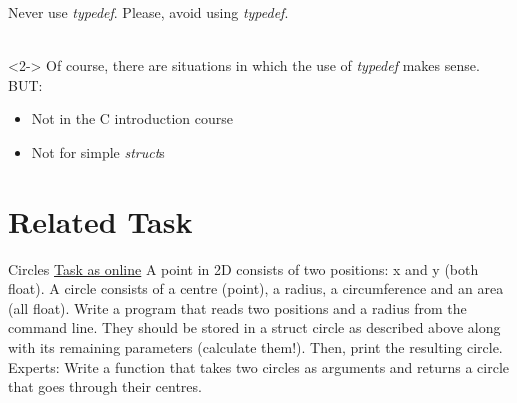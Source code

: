 \begin{frame}{Never use \textit{typedef}.}
	\LARGE
	\centering
	Please, avoid using \textit{typedef}.\footnotemark \ \\ \ \\
	\normalsize
	\flushleft
	\begin{uncoverenv}<2->
		Of course, there are situations in which the use of \textit{typedef} makes sense. BUT:
		\begin{itemize}
			\item Not in the C introduction course
			\item Not for simple \textit{struct}s
		\end{itemize}
	\end{uncoverenv}
\end{frame}

\section{Related Task}

\begin{frame}{Circles}
    \href{http://fsr.github.io/c-lessons/exercises/21_Circles.html}{Task as online}
    \newline
    A point in 2D consists of two positions: x and y (both float). A circle consists of a 
    centre (point), a radius, a circumference and an area (all float).
    \newline
    Write a program that reads two positions and a radius from the command line. They should
    be stored in a struct circle as described above along with its remaining parameters 
    (calculate them!). Then, print the resulting circle.
    \newline 
    \newline
    Experts: Write a function that takes two circles as arguments and returns a circle that 
    goes through their centres.
\end{frame}



